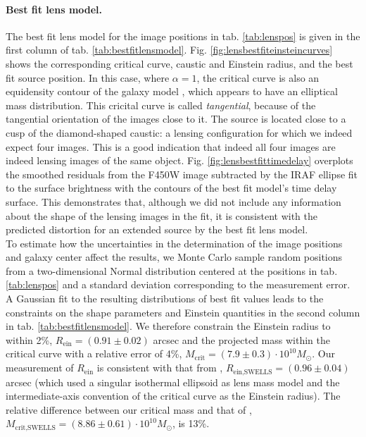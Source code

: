 \paragraph{Best fit lens model.} The best fit lens model for the image positions in tab. \ref{tab:lenspos} is given in the first column of tab. \ref{tab:bestfitlensmodel}. Fig. \ref{fig:lensbestfiteinsteincurves} shows the corresponding critical curve, caustic and Einstein radius, and the best fit source position. In this case, where $\alpha=1$, the critical curve is also an equidensity contour of the galaxy model \citep{EvansWitt}, which appears to have an elliptical mass distribution. This cricital curve is called \emph{tangential}, because of the tangential orientation of the images close to it. The source is located close to a cusp of the diamond-shaped caustic: a lensing configuration for which we indeed expect four images. This is a good indication that indeed all four images are indeed lensing images of the same object. Fig. \ref{fig:lensbestfittimedelay} overplots the smoothed residuals from the F450W image subtracted by the IRAF ellipse fit to the surface brightness with the contours of the best fit model's time delay surface. This demonstrates that, although we did not include any information about the shape of the lensing images in the fit, it is consistent with the predicted distortion for an extended source by the best fit lens model.
\\To estimate how the uncertainties in the determination of the image positions and galaxy center affect the results, we Monte Carlo sample random positions from a two-dimensional Normal distribution centered at the positions in tab. \ref{tab:lenspos} and a standard deviation corresponding to the measurement error. A Gaussian fit to the resulting distributions of best fit values leads to the constraints on the shape parameters and Einstein quantities in the second column in tab. \ref{tab:bestfitlensmodel}. We therefore constrain the Einstein radius to within 2\%, $R_\text{ein} = (0.91 \pm 0.02)$ arcsec and the projected mass within the critical curve with a relative error of 4\%, $M_\text{crit} =(7.9\pm0.3)\cdot 10^{10} M_\odot$. Our measurement of $R_\text{ein}$ is consistent with that from \citet{SWELLSIII}, $R_\text{ein,SWELLS} = (0.96 \pm 0.04)$ arcsec (which used a singular isothermal ellipsoid as lens mass model and the intermediate-axis convention of the critical curve as the Einstein radius). The relative difference between our critical mass and that of \citet{SWELLSIII}, $M_\text{crit,SWELLS} =(8.86\pm0.61)\cdot 10^{10} M_\odot$, is 13\%.

